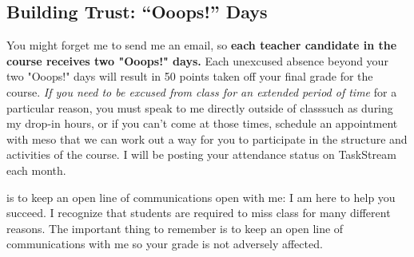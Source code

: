 \subsection{Building Trust: \enquote{Ooops!} Days}
You might forget me to send me an email, so \textbf{each teacher candidate in the course receives two "Ooops!" days.} Each unexcused absence beyond your two "Ooops!" days will result in 50 points taken off your final grade for the course. \emph{If you need to be excused from class for an extended period of time} for a particular reason, you must speak to me directly outside of class\textemdash{}such as during my drop-in hours, or if you can't come at those times, schedule an appointment with me\textemdash{}so that we can work out a way for you to participate in the structure and activities of the course. I will be posting your attendance status on TaskStream each month.

 is to keep an open line of communications open with me: I am here to help you succeed. I recognize that students are required to miss class for many different reasons. The important thing to remember is to keep an open line of communications with me so your grade is not adversely affected.